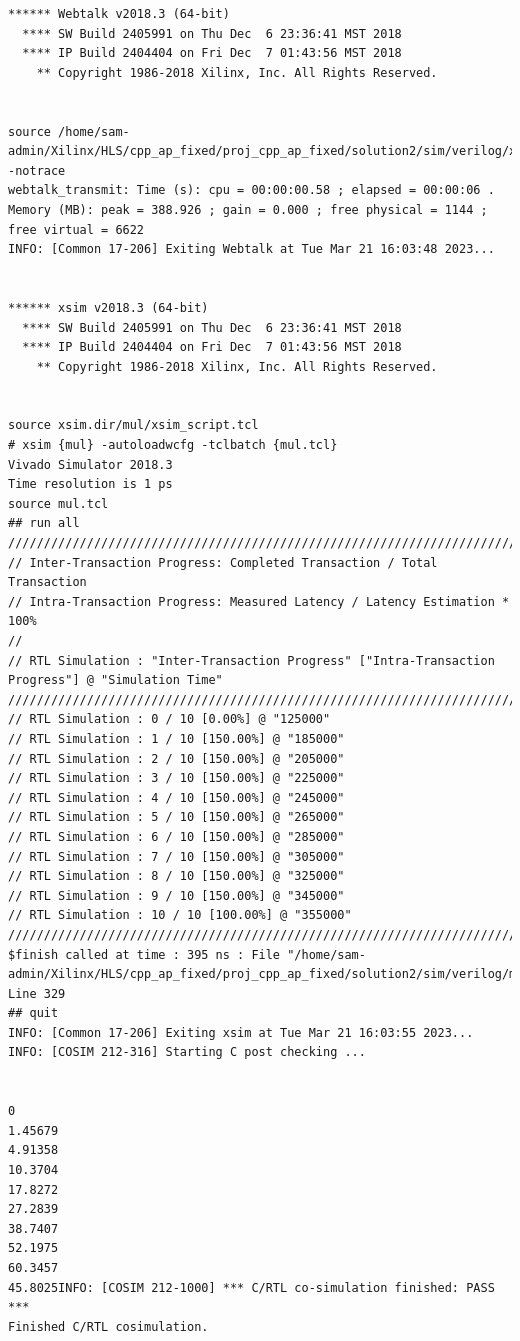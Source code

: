 \documentclass{article}
\begin{document}
\begin{lstlisting}
****** Webtalk v2018.3 (64-bit)
  **** SW Build 2405991 on Thu Dec  6 23:36:41 MST 2018
  **** IP Build 2404404 on Fri Dec  7 01:43:56 MST 2018
    ** Copyright 1986-2018 Xilinx, Inc. All Rights Reserved.


source /home/sam-admin/Xilinx/HLS/cpp_ap_fixed/proj_cpp_ap_fixed/solution2/sim/verilog/xsim.dir/mul/webtalk/xsim_webtalk.tcl -notrace
webtalk_transmit: Time (s): cpu = 00:00:00.58 ; elapsed = 00:00:06 . Memory (MB): peak = 388.926 ; gain = 0.000 ; free physical = 1144 ; free virtual = 6622
INFO: [Common 17-206] Exiting Webtalk at Tue Mar 21 16:03:48 2023...


****** xsim v2018.3 (64-bit)
  **** SW Build 2405991 on Thu Dec  6 23:36:41 MST 2018
  **** IP Build 2404404 on Fri Dec  7 01:43:56 MST 2018
    ** Copyright 1986-2018 Xilinx, Inc. All Rights Reserved.


source xsim.dir/mul/xsim_script.tcl
# xsim {mul} -autoloadwcfg -tclbatch {mul.tcl}
Vivado Simulator 2018.3
Time resolution is 1 ps
source mul.tcl
## run all
////////////////////////////////////////////////////////////////////////////////////
// Inter-Transaction Progress: Completed Transaction / Total Transaction
// Intra-Transaction Progress: Measured Latency / Latency Estimation * 100%
//
// RTL Simulation : "Inter-Transaction Progress" ["Intra-Transaction Progress"] @ "Simulation Time"
////////////////////////////////////////////////////////////////////////////////////
// RTL Simulation : 0 / 10 [0.00%] @ "125000"
// RTL Simulation : 1 / 10 [150.00%] @ "185000"
// RTL Simulation : 2 / 10 [150.00%] @ "205000"
// RTL Simulation : 3 / 10 [150.00%] @ "225000"
// RTL Simulation : 4 / 10 [150.00%] @ "245000"
// RTL Simulation : 5 / 10 [150.00%] @ "265000"
// RTL Simulation : 6 / 10 [150.00%] @ "285000"
// RTL Simulation : 7 / 10 [150.00%] @ "305000"
// RTL Simulation : 8 / 10 [150.00%] @ "325000"
// RTL Simulation : 9 / 10 [150.00%] @ "345000"
// RTL Simulation : 10 / 10 [100.00%] @ "355000"
////////////////////////////////////////////////////////////////////////////////////
$finish called at time : 395 ns : File "/home/sam-admin/Xilinx/HLS/cpp_ap_fixed/proj_cpp_ap_fixed/solution2/sim/verilog/mul.autotb.v" Line 329
## quit
INFO: [Common 17-206] Exiting xsim at Tue Mar 21 16:03:55 2023...
INFO: [COSIM 212-316] Starting C post checking ...


0
1.45679
4.91358
10.3704
17.8272
27.2839
38.7407
52.1975
60.3457
45.8025INFO: [COSIM 212-1000] *** C/RTL co-simulation finished: PASS ***
Finished C/RTL cosimulation.


\end{lstlisting}
\vspace{15cm}
\end{document}
